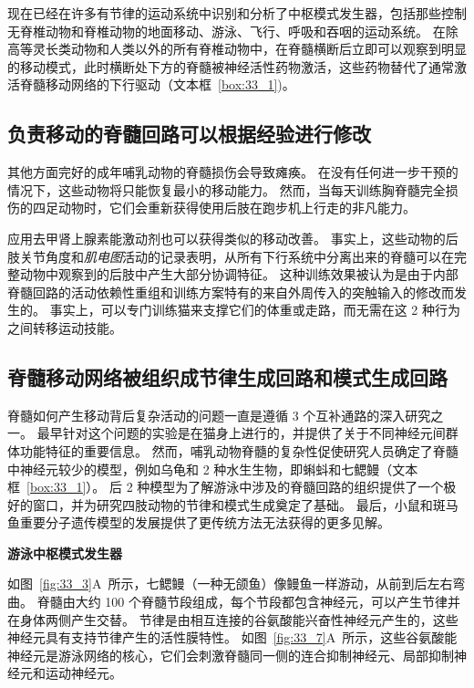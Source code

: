 现在已经在许多有节律的运动系统中识别和分析了中枢模式发生器，包括那些控制无脊椎动物和脊椎动物的地面移动、游泳、飞行、呼吸和吞咽的运动系统。
在除高等灵长类动物和人类以外的所有脊椎动物中，在脊髓横断后立即可以观察到明显的移动模式，此时横断处下方的脊髓被神经活性药物激活，这些药物替代了通常激活脊髓移动网络的下行驱动（文本框~\ref{box:33_1})。



\subsection{负责移动的脊髓回路可以根据经验进行修改}

其他方面完好的成年哺乳动物的脊髓损伤会导致瘫痪。
在没有任何进一步干预的情况下，这些动物将只能恢复最小的移动能力。
然而，当每天训练胸脊髓完全损伤的四足动物时，它们会重新获得使用后肢在跑步机上行走的非凡能力。


应用去甲肾上腺素能激动剂也可以获得类似的移动改善。
事实上，这些动物的后肢关节角度和\textit{肌电图}活动的记录表明，从所有下行系统中分离出来的脊髓可以在完整动物中观察到的后肢中产生大部分协调特征。
这种训练效果被认为是由于内部脊髓回路的活动依赖性重组和训练方案特有的来自外周传入的突触输入的修改而发生的。
事实上，可以专门训练猫来支撑它们的体重或走路，而无需在这 2 种行为之间转移运动技能。



\subsection{脊髓移动网络被组织成节律生成回路和模式生成回路}

脊髓如何产生移动背后复杂活动的问题一直是遵循 3 个互补通路的深入研究之一。
最早针对这个问题的实验是在猫身上进行的，并提供了关于不同神经元间群体功能特征的重要信息。
然而，哺乳动物脊髓的复杂性促使研究人员确定了脊髓中神经元较少的模型，例如乌龟和 2 种水生生物，即蝌蚪和七鳃鳗（文本框~\ref{box:33_1}）。
后 2 种模型为了解游泳中涉及的脊髓回路的组织提供了一个极好的窗口，并为研究四肢动物的节律和模式生成奠定了基础。
最后，小鼠和斑马鱼重要分子遗传模型的发展提供了更传统方法无法获得的更多见解。


\textbf{游泳中枢模式发生器}

如图~\ref{fig:33_3}A~所示，七鳃鳗（一种无颌鱼）像鳗鱼一样游动，从前到后左右弯曲。
脊髓由大约 100 个脊髓节段组成，每个节段都包含神经元，可以产生节律并在身体两侧产生交替。
节律是由相互连接的谷氨酸能兴奋性神经元产生的，这些神经元具有支持节律产生的活性膜特性。
如图~\ref{fig:33_7}A~所示，这些谷氨酸能神经元是游泳网络的核心，它们会刺激脊髓同一侧的连合抑制神经元、局部抑制神经元和运动神经元。


